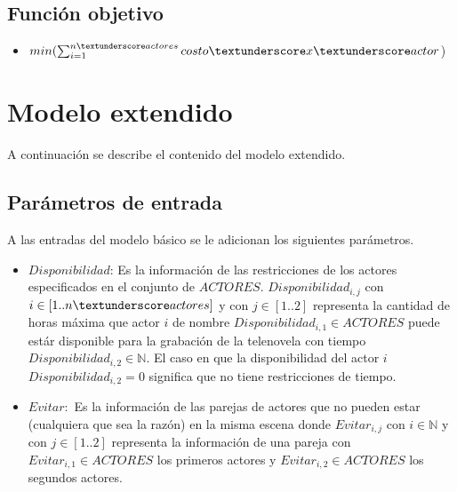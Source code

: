 \documentclass{article}
\begin{document}
\subsection{Función objetivo}
\begin{itemize}
    \item $min(\sum_{i=1}^{n\textunderscore actores}costo\textunderscore x\textunderscore actor$)
\end{itemize}

\section{Modelo extendido}
A continuación se describe el contenido del modelo extendido. \newline

\subsection{Parámetros de entrada}
A las entradas del modelo básico se le adicionan los siguientes parámetros.
\begin{itemize}
    \item $Disponibilidad$: Es la información de las restricciones de los actores especificados en el conjunto de $ACTORES$. $Disponibilidad_{i,j}$ con $i \in [1..n\textunderscore actores]$ y con $j \in [1..2]$ representa la cantidad de horas máxima que actor $i$ de nombre $Disponibilidad_{i,1} \in ACTORES$ puede estár disponible para la grabación de la telenovela con tiempo $Disponibilidad_{i,2} \in \mathbb{N} $. El caso en que la disponibilidad del actor $i$  $Disponibilidad_{i,2} = 0$ significa que no tiene restricciones de tiempo.
    \item $Evitar:$ Es la información de las parejas de actores que no 
    pueden estar (cualquiera que sea la razón) en la misma escena donde $Evitar_{i,j}$ con $i \in \mathbb{N}$ y con $j \in [1..2]$ representa la información de una pareja con $Evitar_{i,1} \in ACTORES$ los primeros actores y $Evitar_{i,2} \in ACTORES$ los segundos actores.
\end{itemize}
\end{document}
